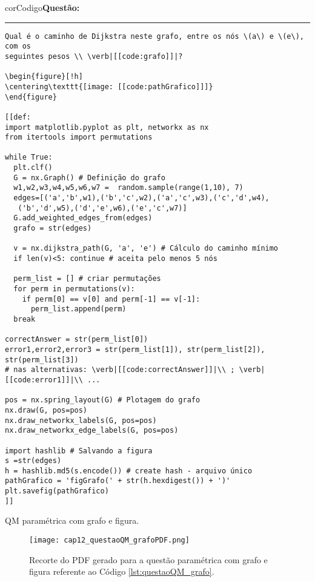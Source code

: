 \begin{listing}[!ht]
\begin{myboxCode}{corCodigo}{\textbf{Questão: } }\vspace{3mm}
\hrule
\begin{verbatim}
Qual é o caminho de Dijkstra neste grafo, entre os nós \(a\) e \(e\), com os 
seguintes pesos \\ \verb|[[code:grafo]]|?

\begin{figure}[!h] 
\centering\texttt{[image: [[code:pathGrafico]]]}
\end{figure} 

[[def:
import matplotlib.pyplot as plt, networkx as nx
from itertools import permutations

while True:
  plt.clf()
  G = nx.Graph() # Definição do grafo
  w1,w2,w3,w4,w5,w6,w7 =  random.sample(range(1,10), 7)
  edges=[('a','b',w1),('b','c',w2),('a','c',w3),('c','d',w4),
   ('b','d',w5),('d','e',w6),('e','c',w7)]
  G.add_weighted_edges_from(edges)
  grafo = str(edges)

  v = nx.dijkstra_path(G, 'a', 'e') # Cálculo do caminho mínimo
  if len(v)<5: continue # aceita pelo menos 5 nós

  perm_list = [] # criar permutações
  for perm in permutations(v):
    if perm[0] == v[0] and perm[-1] == v[-1]:
      perm_list.append(perm)
  break

correctAnswer = str(perm_list[0])
error1,error2,error3 = str(perm_list[1]), str(perm_list[2]), str(perm_list[3])
# nas alternativas: \verb|[[code:correctAnswer]]|\\ ; \verb|[[code:error1]]|\\ ...

pos = nx.spring_layout(G) # Plotagem do grafo
nx.draw(G, pos=pos)
nx.draw_networkx_labels(G, pos=pos)
nx.draw_networkx_edge_labels(G, pos=pos)

import hashlib # Salvando a figura
s =str(edges) 
h = hashlib.md5(s.encode()) # create hash - arquivo único
pathGrafico = 'figGrafo(' + str(h.hexdigest()) + ')' 
plt.savefig(pathGrafico)
]]
\end{verbatim}
\end{myboxCode}
\caption{QM paramétrica com grafo e figura.}
\label{lst:questaoQM_grafo}
\end{listing}

\begin{figure}[!ht]
  \texttt{[image: cap12\_questaoQM\_grafoPDF.png]}
  \caption{Recorte do PDF gerado para a questão paramétrica com grafo e figura referente ao Código \ref{lst:questaoQM_grafo}.}
  \label{fig:cap12_questaoQM_grafoPDF}
\end{figure}

